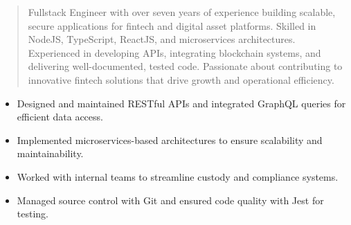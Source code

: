 



\makecvheader

\begin{quote}
  \noindent
  Fullstack Engineer with over seven years of experience building scalable, secure applications for fintech and digital asset platforms. Skilled in NodeJS, TypeScript, ReactJS, and microservices architectures. Experienced in developing APIs, integrating blockchain systems, and delivering well-documented, tested code. Passionate about contributing to innovative fintech solutions that drive growth and operational efficiency.
\end{quote}

\par\smallskip
\noindent
\begin{minipage}{20cm}
  \begin{minipage}{9.75cm}
    \begin{itemize}
      \item Designed and maintained RESTful APIs and integrated GraphQL queries for efficient data access.
      \item Implemented microservices-based architectures to ensure scalability and maintainability.
    \end{itemize}
  \end{minipage}
  \hfill
  \begin{minipage}{9.75cm}
    \begin{itemize}
      \item Worked with internal teams to streamline custody and compliance systems.
      \item Managed source control with Git and ensured code quality with Jest for testing.
    \end{itemize}
  \end{minipage}
\end{minipage}
\par\smallskip
\divider

